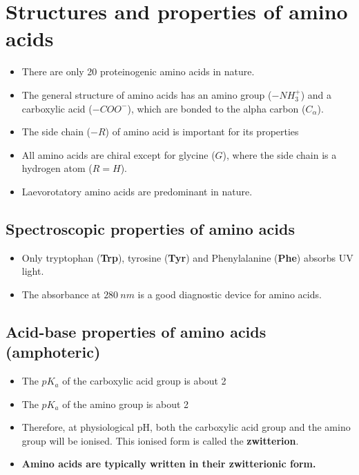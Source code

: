 \documentclass[11pt]{article}
\begin{document}
\section{Structures and properties of amino acids}
\label{sec:org45ef25b}
\begin{itemize}
\item There are only 20 proteinogenic amino acids in nature.
\item The general structure of amino acids has an amino group (\(-NH_3^+\)) and a carboxylic acid (\(-COO^-\)), which are bonded to the alpha carbon (\(C_{\alpha}\)).
\item The side chain (\(-R\)) of amino acid is important for its properties
\item All amino acids are chiral except for glycine (\(G\)), where the side chain is a hydrogen atom (\(R = H\)).
\item Laevorotatory amino acids are predominant in nature.
\end{itemize}
\subsection{Spectroscopic properties of amino acids}
\label{sec:orgee93bab}
\begin{itemize}
\item Only tryptophan (\textbf{Trp}), tyrosine (\textbf{Tyr}) and Phenylalanine (\textbf{Phe}) absorbs UV light.
\item The absorbance at \(\qty{280}{\unit{nm}}\) is a good diagnostic device for amino acids.
\end{itemize}
\subsection{Acid-base properties of amino acids (amphoteric)}
\label{sec:org03e6263}
\begin{itemize}
\item The \(pK_a\) of the carboxylic acid group is about 2
\item The \(pK_a\) of the amino group is about 2
\item Therefore, at physiological pH, both the carboxylic acid group and the amino group will be ionised. This ionised form is called the \textbf{zwitterion}.
\item \textbf{Amino acids are typically written in their zwitterionic form.}
\end{itemize}
\end{document}
